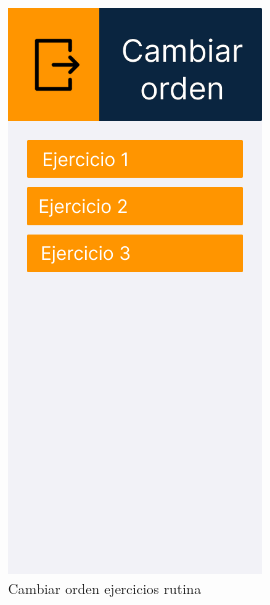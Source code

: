 \begin{figure}[H]
   \centering
    \includegraphics[width=0.6\textwidth]{fotos/Frame 51.png}
    \caption{Cambiar orden ejercicios rutina}
    \label{fig:Cambiar orden ejercicios rutina}
\end{figure}
